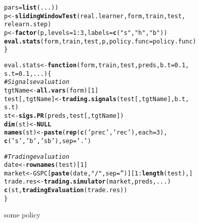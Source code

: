 \documentclass{article}\usepackage[]{graphicx}\usepackage[]{color}
\makeatletter
\newcommand{\hlnum}[1]{\textcolor[rgb]{0.686,0.059,0.569}{#1}}%
\newcommand{\hlstr}[1]{\textcolor[rgb]{0.192,0.494,0.8}{#1}}%
\newcommand{\hlcom}[1]{\textcolor[rgb]{0.678,0.584,0.686}{\textit{#1}}}%
\newcommand{\hlopt}[1]{\textcolor[rgb]{0,0,0}{#1}}%
\newcommand{\hlstd}[1]{\textcolor[rgb]{0.345,0.345,0.345}{#1}}%
\newcommand{\hlkwa}[1]{\textcolor[rgb]{0.161,0.373,0.58}{\textbf{#1}}}%
\newcommand{\hlkwb}[1]{\textcolor[rgb]{0.69,0.353,0.396}{#1}}%
\newcommand{\hlkwc}[1]{\textcolor[rgb]{0.333,0.667,0.333}{#1}}%
\newcommand{\hlkwd}[1]{\textcolor[rgb]{0.737,0.353,0.396}{\textbf{#1}}}%
\newenvironment{kframe}{%
 \def\at@end@of@kframe{}%
 \ifinner\ifhmode%
  \def\at@end@of@kframe{\end{minipage}}%
  \begin{minipage}{\columnwidth}%
 \fi\fi%
 \def\FrameCommand##1{\hskip\@totalleftmargin \hskip-\fboxsep
 \colorbox{shadecolor}{##1}\hskip-\fboxsep
     \hskip-\linewidth \hskip-\@totalleftmargin \hskip\columnwidth}%
 \MakeFramed {\advance\hsize-\width
   \@totalleftmargin\z@ \linewidth\hsize
   \@setminipage}}%
 {\par\unskip\endMakeFramed%
 \at@end@of@kframe}
\newenvironment{knitrout}{}{} %
\makeatother
\begin{document}
\begin{knitrout}
\begin{kframe}
\begin{alltt}
                           \hlkwc{pars} \hlstd{=}\hlkwd{list}\hlstd{(...))}
  \hlstd{p} \hlkwb{<-} \hlkwd{slidingWindowTest}\hlstd{(real.learner, form, train, test,}
                         \hlstd{relearn.step)}
  \hlstd{p} \hlkwb{<-} \hlkwd{factor}\hlstd{(p,} \hlkwc{levels} \hlstd{=} \hlnum{1}\hlopt{:}\hlnum{3}\hlstd{,} \hlkwc{labels} \hlstd{=} \hlkwd{c}\hlstd{(}\hlstr{"s"}\hlstd{,} \hlstr{"h"}\hlstd{,} \hlstr{"b"}\hlstd{))}
  \hlkwd{eval.stats}\hlstd{(form, train, test, p,} \hlkwc{policy.func} \hlstd{= policy.func)}
\hlstd{\}}
\end{alltt}
\end{kframe}
\end{knitrout}
\begin{knitrout}
\color{fgcolor}\begin{kframe}
\begin{alltt}
\hlstd{eval.stats} \hlkwb{<-} \hlkwa{function}\hlstd{(}\hlkwc{form}\hlstd{,} \hlkwc{train}\hlstd{,} \hlkwc{test}\hlstd{,} \hlkwc{preds}\hlstd{,} \hlkwc{b.t} \hlstd{=} \hlnum{0.1}\hlstd{,}
                       \hlkwc{s.t} \hlstd{=} \hlnum{0.1}\hlstd{,} \hlkwc{...}\hlstd{) \{}
  \hlcom{#Signals evaluation}
  \hlstd{tgtName} \hlkwb{<-} \hlkwd{all.vars}\hlstd{(form)[}\hlnum{1}\hlstd{]}
  \hlstd{test[, tgtName]} \hlkwb{<-} \hlkwd{trading.signals}\hlstd{(test[ , tgtName], b.t,}
                                     \hlstd{s.t)}
  \hlstd{st} \hlkwb{<-} \hlkwd{sigs.PR}\hlstd{(preds, test[, tgtName])}
  \hlkwd{dim}\hlstd{(st)} \hlkwb{<-} \hlkwa{NULL}
  \hlkwd{names}\hlstd{(st)} \hlkwb{<-} \hlkwd{paste}\hlstd{(}\hlkwd{rep}\hlstd{(}\hlkwd{c}\hlstd{(}\hlstr{'prec'}\hlstd{,} \hlstr{'rec'}\hlstd{),} \hlkwc{each} \hlstd{=} \hlnum{3}\hlstd{),}
                     \hlkwd{c}\hlstd{(}\hlstr{'s'}\hlstd{,} \hlstr{'b'}\hlstd{,} \hlstr{'sb'}\hlstd{),} \hlkwc{sep} \hlstd{=} \hlstr{'.'}\hlstd{)}

  \hlcom{#Trading evaluation }
  \hlstd{date} \hlkwb{<-} \hlkwd{rownames}\hlstd{(test)[}\hlnum{1}\hlstd{]}
  \hlstd{market} \hlkwb{<-} \hlstd{GSPC[}\hlkwd{paste}\hlstd{(date,} \hlstr{"/"}\hlstd{,} \hlkwc{sep} \hlstd{=} \hlstr{''}\hlstd{)][}\hlnum{1}\hlopt{:}\hlkwd{length}\hlstd{(test), ]}
  \hlstd{trade.res} \hlkwb{<-} \hlkwd{trading.simulator}\hlstd{(market, preds, ...)}
  \hlkwd{c}\hlstd{(st,} \hlkwd{tradingEvaluation}\hlstd{(trade.res))}
                       \hlstd{\}}
\end{alltt}
\end{kframe}
\end{knitrout}
some policy
\end{document}
